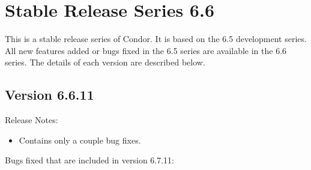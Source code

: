 \section{\label{sec:History-6-6}Stable Release Series 6.6}

This is a stable release series of Condor.
It is based on the 6.5 development series.
All new features added or bugs fixed in the 6.5 series are available
in the 6.6 series.
The details of each version are described below.

\subsection{\label{sec:New-6-6-11}Version 6.6.11}

\noindent Release Notes:

\begin{itemize}

\item Contains only a couple bug fixes.

\end{itemize}

%
%
%

\noindent Bugs fixed that are included in version 6.7.11:

